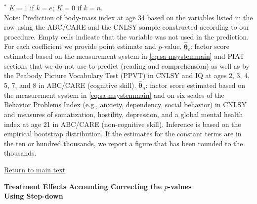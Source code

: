\documentclass[static]{JJH-Beamer}
\begin{document}
\begin{frame}
\begin{table}[H]
\begin{center}
{}
\end{center}
\tiny \flushleft
$^\ast$ $K=1$ if $k=e$; $K=0$ if $k=n$.\\
Note: Prediction of body-mass index at age 34 based on the variables listed in the row using the ABC/CARE and the CNLSY sample constructed according to our procedure. Empty cells indicate that the variable was not used in the prediction. For each coefficient we provide point estimate and $p$-value. $\hat{\bm{\theta}}_{c}$: factor score estimated based on the measurement system in \eqref{eq:sa-msystemmain} and PIAT sections that we do not use to predict (reading and comprehension) as well as by the Peabody Picture Vocabulary Test (PPVT) in CNLSY and IQ at ages 2, 3, 4, 5, 7, and 8 in ABC/CARE (cognitive skill). $\hat{\bm{\theta}}_{n}$: factor score estimated based on the measurement system in \eqref{eq:sa-msystemmain} and on six scales of the Behavior Problems Index (e.g., anxiety, dependency, social behavior) in CNLSY and measures of somatization, hostility, depression, and a global mental health index at age 21 in ABC/CARE (non-cognitive skill). Inference is based on the empirical bootstrap distribution. If the estimates for the constant terms are in the ten or hundred thousands, we report a figure that has been rounded to the thousands.\\
\end{table}

\end{frame}

\begin{frame}
 \addtocounter{framenumber}{-1}

\begin{center}
\hyperlink{ret:creamcheese}{\underline{Return to main text}}
\end{center}

\end{frame}

\begin{frame}
 \addtocounter{framenumber}{-1}

\hypertarget{frosting}{}
\begin{center}
\textbf{Treatment Effects Accounting Correcting the $p$-values\\ Using Step-down}
\end{center}

\end{frame}
\end{document}
